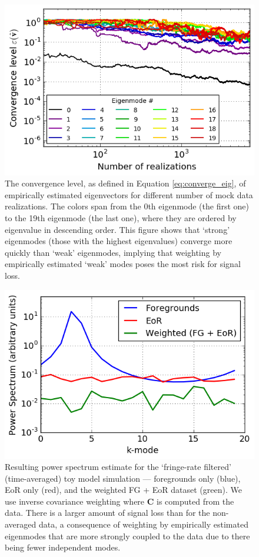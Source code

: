 \documentclass[preprint2,numberedappendix,tighten]{aastex6}  %
\begin{document}
\begin{figure}
	\centering
	\includegraphics[width=\columnwidth]{plots/toy_sigloss17.png}
	\caption{The convergence level, as defined in Equation \eqref{eq:converge_eig}, of empirically estimated eigenvectors for different number of mock data realizations. The colors span from the 0th eigenmode (the first one) to the 19th eigenmode (the last one), where they are ordered by eigenvalue in descending order. This figure shows that `strong' eigenmodes (those with the highest eigenvalues) converge more quickly than `weak' eigenmodes, implying that weighting by empirically estimated `weak' modes poses the most risk for signal loss.}
	\label{fig:toy_sigloss17}
\end{figure}

\begin{figure}
	\centering
	\includegraphics[trim={0cm 0cm 0cm 0cm},clip,width=\columnwidth]{plots/toy_sigloss7.png}
	\caption{Resulting power spectrum estimate for the `fringe-rate filtered' (time-averaged) toy model simulation --- foregrounds only (blue), 
EoR only (red), and the weighted FG + EoR dataset (green). We use inverse covariance weighting where $\textbf{C}$ is 
computed from the data. There is a larger amount of signal loss than for the non-averaged data, a consequence of weighting by empirically estimated eigenmodes that are more strongly coupled to the data due to there being fewer independent modes.}
	\label{fig:toy_sigloss7}
\end{figure}
\end{document}
